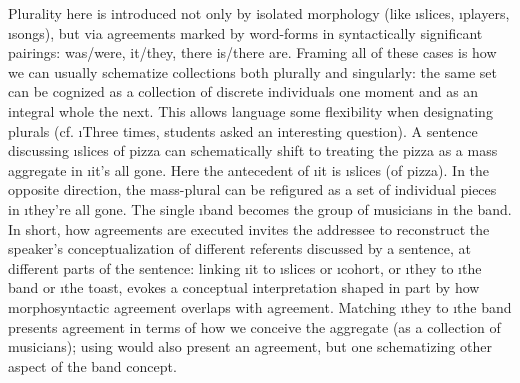 {Plurality here is introduced not only by isolated morphology (like \i{slices},
\i{players}, \i{songs}), but via agreements marked by
word-forms in syntactically significant pairings: was/were, it/they,
there is/there are.  Framing all of these cases is how we can usually schematize
collections both plurally and singularly: the same set can be cognized as a
collection of discrete individuals one moment and as an integral whole the next.
This allows language some flexibility when designating plurals
(cf. \i{Three times, students asked an interesting question}).  A sentence
discussing \i{slices of pizza} can schematically shift to treating
the pizza as a mass aggregate in \i{it's all gone}.  Here the antecedent
of \i{it} is \i{slices} (of pizza).  In the opposite direction, the mass-plural
 can be refigured as a set of individual pieces in \i{they're all gone}.
The single \i{band} becomes the group of musicians in the band.
In short, how agreements are executed invites the addressee to reconstruct
the speaker's conceptualization of different referents discussed by
a sentence, at different parts of the sentence: linking
\i{it} to \i{slices} or \i{cohort}, or \i{they} to \i{the band} or
\i{the toast}, evokes a conceptual interpretation shaped in
part by how morphosyntactic agreement overlaps with 
agreement.  Matching \i{they} to \i{the band} presents agreement
in terms of how we conceive the aggregate (as a collection of
musicians); using  would also present an agreement, but
one schematizing other aspect of the band concept.}


